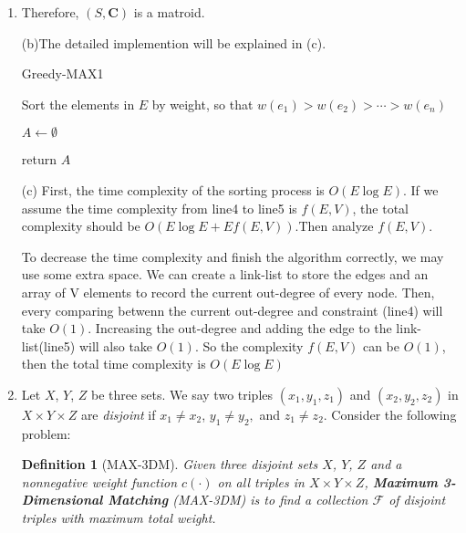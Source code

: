\documentclass[12pt,a4paper]{article}
\makeatletter
\newtheorem*{solution}{Solution}
\newtheorem{definition}{Definition}
\theoremstyle{definition}
\renewenvironment{solution}[1][Solution] {\par\pushQED{\qed}\normalfont\topsep6\p@\@plus6\p@\relax\trivlist\item[\hskip\labelsep\bfseries#1\@addpunct{.}]\ignorespaces}{\popQED\endtrivlist\@endpefalse} \makeatother
\makeatother
\begin{document}
\begin{enumerate}
\begin{solution}
	Therefore, $(S,\textbf{C})$ is a matroid.
	
	(b)The detailed implemention will be explained in (c).	
	
	\begin{minipage}[t]{0.95\textwidth}
		\begin{algorithm}[H]
			
			\BlankLine
			\caption{Greedy-MAX1}\label{Alg_Quick}
			
		    Sort the elements in $E$ by weight, so that $w(e_1)>w(e_2)>\cdots>w(e_n) $ \;
			
		    $A\leftarrow \emptyset$\;
			
			return $A$\;
		\end{algorithm}
	\end{minipage}
	
	(c) First, the time complexity of the sorting process is $O(E\log E)$. If we assume the time complexity from line4 to line5 is $f(E,V)$, the total complexity should be $O(E\log E +Ef(E,V)). $Then analyze $f(E,V)$.
	
	 To decrease the time complexity and finish the algorithm correctly, we may use some extra space. 
	 We can create a link-list to store the edges and an array of V elements to record the current out-degree of every node. Then, every comparing betwenn the current out-degree and constraint (line4) will take $O(1)$. Increasing the out-degree and adding the edge to the link-list(line5) will also take $O(1)$. So the complexity $f(E,V)$ can be $O(1)$, then the total time complexity is $O(E\log E)$
	
\end{solution}






\item Let $X$, $Y$, $Z$ be three sets. We say two triples $\left(x_{1}, y_{1}, z_{1}\right)$ and $\left(x_{2}, y_{2}, z_{2}\right)$ in $X \times Y \times Z$ are \textit{disjoint} if $x_{1} \neq x_{2}$, $y_{1} \neq y_{2},$ and $z_{1} \neq z_{2}$. Consider the following problem:
    
    \begin{definition}[MAX-3DM] 
        Given three disjoint sets $X$, $Y$, $Z$ and a nonnegative weight function $c(\cdot)$ on all triples in $X \times Y \times Z$, \textbf{Maximum 3-Dimensional Matching} (MAX-3DM) is to find a collection $\mathcal{F}$ of disjoint triples with maximum total weight.
    \end{definition}


\end{enumerate}
\end{document}
